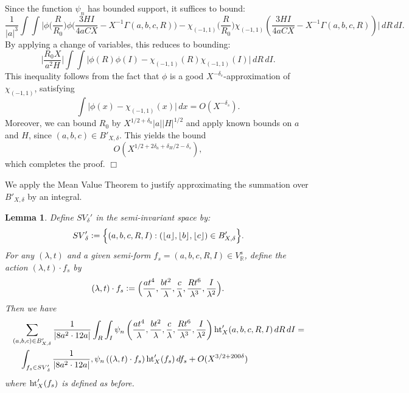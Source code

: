 \documentclass{article}
\def\R{{\mathbb R}}
\def \h{{\rm ht}}
\newtheorem{lemma}[theorem]{Lemma}
\newenvironment{proof}{\noindent {\bf Proof:}}{$\Box$ \vspace{2 ex}}
\def \SV{{SV}_{\delta}}
\begin{document}
\begin{proof}
Since the function $\psi_{n}$ has bounded support, it suffices to bound:
\begin{equation*} \frac{1}{|a|^3} \int \int \Big| \phi \Big( \frac{R}{R_0} \Big) \phi \Big( \frac{3HI}{4aCX} - X^{-1}\Gamma(a, b, c, R) \Big) - \chi_{(-1,1)} \Big( \frac{R}{R_0} \Big) \chi_{(-1,1)} \left( \frac{3HI}{4aCX} - X^{-1}\Gamma(a, b, c, R) \right)\Big| \, dR \, dI. \end{equation*}
By applying a change of variables, this reduces to bounding:
\begin{equation*} \Big| \frac{R_0 X}{a^2 H} \Big| \int \int \Big| \phi(R) \phi(I) - \chi_{(-1,1)}(R) \chi_{(-1,1)}(I) \Big| \, dR \, dI. \end{equation*}
This inequality follows from the fact that $\phi$ is a good $X^{-\delta_s}$-approximation of $\chi_{(-1,1)}$, satisfying  
\begin{equation*}  
\int \Big| \phi(x) - \chi_{(-1,1)}(x) \Big| \, dx = O(X^{-\delta_s}).  
\end{equation*}  
Moreover, we can bound $R_0$ by $X^{1/2+\delta_a} |a| |H|^{1/2}$ and apply known bounds on $a$ and $H$, since $(a,b,c) \in B'_{X,\delta}$. This yields the bound  
\begin{equation*}  
O(X^{1/2+2\delta_a+\delta_H/2-\delta_s}),  
\end{equation*}  
which completes the proof.
\end{proof}

We apply the Mean Value Theorem to justify approximating the summation over $B'_{X,\delta}$ by an integral.


\begin{lemma}\label{help fglueing lemma} 
Define $\SV'$ in the semi-invariant space by:
\begin{equation*}
\SV' \vcentcolon= \Big\{(a,b,c,R,I) : (\lfloor a \rfloor, \lfloor b \rfloor, \lfloor c \rfloor) \in B'_{X,\delta} \Big\}. 
\end{equation*} 
For any $(\lambda, t)$ and a given semi-form $f_s = (a, b, c, R, I) \in V_{\R}^s$, define the action $(\lambda, t) \cdot f_s$ by 
\begin{equation*} 
(\lambda, t) \cdot f_s \vcentcolon= \Big(\frac{at^4}{\lambda}, \frac{bt^2}{\lambda}, \frac{c}{\lambda}, \frac{Rt^6}{\lambda^3}, \frac{I}{\lambda^2}\Big).
\end{equation*}
Then we have
\begin{align*} 
&\sum_{(a,b,c) \in B'_{X,\delta}} \frac{1}{|8a^2 \cdot 12a|} \int_R \int_I \psi_{n} \left( \frac{at^4}{\lambda}, \frac{bt^2}{\lambda}, \frac{c}{\lambda}, \frac{Rt^6}{\lambda^3}, \frac{I}{\lambda^2} \right) \h_X'(a,b,c,R,I) \, dR \, dI 
= \\
&\quad\int_{f_s \in \SV'} \frac{1}{|8a^2 \cdot 12a|} , \psi_{n}\left((\lambda, t) \cdot f_s\right) \h_X'(f_s) \, df_s +
O(X^{3/2 +200\delta}) \end{align*} 
where $\h_X'(f_s)$ is defined as before.
\end{lemma}
\end{document}
